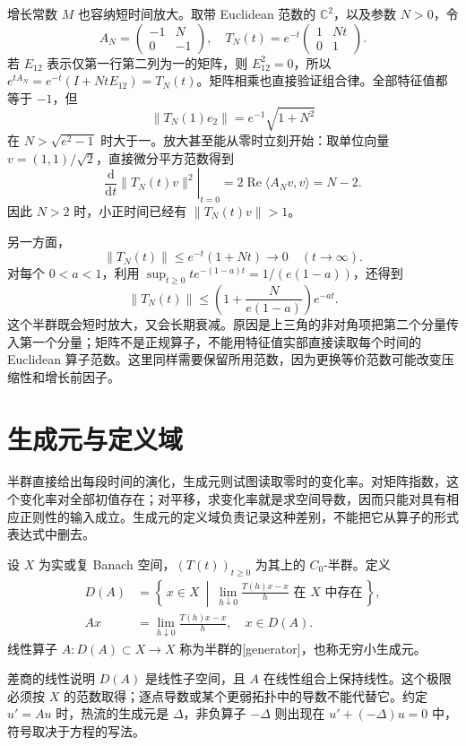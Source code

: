 增长常数 \(M\) 也容纳短时间放大。取带 Euclidean 范数的 \(\mathbb C^2\)，以及参数 \(N>0\)，令
\[
 A_N=\begin{pmatrix}-1&N\\0&-1\end{pmatrix},
 \quad
 T_N(t)=e^{-t}\begin{pmatrix}1&Nt\\0&1\end{pmatrix}.
\]
若 \(E_{12}\) 表示仅第一行第二列为一的矩阵，则 \(E_{12}^2=0\)，所以
\(e^{tA_N}=e^{-t}(I+NtE_{12})=T_N(t)\)。矩阵相乘也直接验证组合律。全部特征值都等于 \(-1\)，但
\[
 \|T_N(1)e_2\|=e^{-1}\sqrt{1+N^2}
\]
在 \(N>\sqrt{e^2-1}\) 时大于一。放大甚至能从零时立刻开始：取单位向量 \(v=(1,1)/\sqrt2\)，直接微分平方范数得到
\[
 \left.\frac{\mathrm d}{\mathrm dt}\|T_N(t)v\|^2\right|_{t=0}
 =2\operatorname{Re}\langle A_Nv,v\rangle=N-2.
\]
因此 \(N>2\) 时，小正时间已经有 \(\|T_N(t)v\|>1\)。

\ProseParagraphBreak

另一方面，
\[
 \|T_N(t)\|\leq e^{-t}(1+Nt)\longrightarrow0
 \quad(t\to\infty).
\]
对每个 \(0<a<1\)，利用 \(\sup_{t\geq0}t e^{-(1-a)t}=1/(e(1-a))\)，还得到
\[
 \|T_N(t)\|
 \leq\left(1+\frac{N}{e(1-a)}\right)e^{-at}.
\]
这个半群既会短时放大，又会长期衰减。原因是上三角的非对角项把第二个分量传入第一个分量；矩阵不是正规算子，不能用特征值实部直接读取每个时间的 Euclidean 算子范数。这里同样需要保留所用范数，因为更换等价范数可能改变压缩性和增长前因子。

\section{生成元与定义域}
\label{b2:sec:app-D-2}

半群直接给出每段时间的演化，生成元则试图读取零时的变化率。对矩阵指数，这个变化率对全部初值存在；对平移，求变化率就是求空间导数，因而只能对具有相应正则性的输入成立。生成元的定义域负责记录这种差别，不能把它从算子的形式表达式中删去。

\begin{definition}\label{b2:def:D-generator}
设 \(X\) 为实或复 Banach 空间，\((T(t))_{t\geq0}\) 为其上的 \(C_0\)-半群。定义
\[
 \begin{aligned}
 D(A)&=\left\{\,x\in X\ \middle|\
       \lim_{h\downarrow0}\frac{T(h)x-x}{h}
       \text{ 在 }X\text{ 中存在}\,\right\},\\
 Ax&=\lim_{h\downarrow0}\frac{T(h)x-x}{h},
 \quad x\in D(A).
 \end{aligned}
\]
线性算子 \(A:D(A)\subset X\to X\) 称为半群的[generator]，也称无穷小生成元。
\end{definition}
差商的线性说明 \(D(A)\) 是线性子空间，且 \(A\) 在线性组合上保持线性。这个极限必须按 \(X\) 的范数取得；逐点导数或某个更弱拓扑中的导数不能代替它。约定 \(u'=Au\) 时，热流的生成元是 \(\Delta\)，非负算子 \(-\Delta\) 则出现在 \(u'+(-\Delta)u=0\) 中，符号取决于方程的写法。

